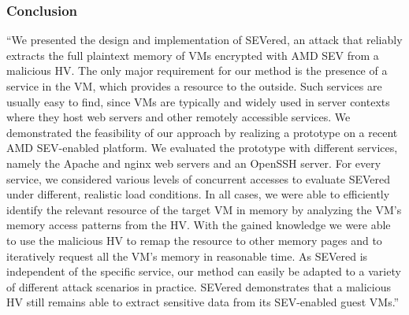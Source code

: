 \subsubsection*{Conclusion \cite{morbitzer_severed_2018}}
“We presented the design and implementation of SEVered, an attack that reliably extracts the full plaintext memory of VMs encrypted with AMD SEV from a malicious HV. The only major requirement for our method is the presence of a service in the VM, which provides a resource to the outside. Such services are usually easy to find, since VMs are typically and widely used in server contexts where they host web servers and other remotely accessible services. We demonstrated the feasibility of our approach by realizing a prototype on a recent AMD SEV-enabled platform. We evaluated the prototype with different services, namely the Apache and nginx web servers and an OpenSSH server. For every service, we considered various levels of concurrent accesses to evaluate SEVered under different, realistic load conditions. In all cases, we were able to efficiently identify the relevant resource of the target VM in memory by analyzing the VM’s memory access patterns from the HV. With the gained knowledge we were able to use the malicious HV to remap the resource to other memory pages and to iteratively request all the VM’s memory in reasonable time. As SEVered is independent of the specific service, our method can easily be adapted to a variety of different attack scenarios in practice. SEVered demonstrates that a malicious HV still remains able to extract sensitive data from its SEV-enabled guest VMs.”

